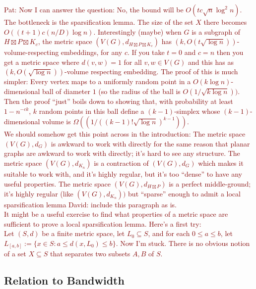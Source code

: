 \documentclass{patmorin}
\renewcommand{\le}{\leqslant}
\newcommand{\david}[1]{{\color{orange} David: #1}}
\newcommand{\pat}[1]{\textcolor{Maroon}{Pat: #1}}
\begin{document}
\pat{Now I can answer the question: No, the bound will be $O(tc\sqrt{n}\log^2 n)$.  The bottleneck is the sparsification lemma.  The size of the set $X$ there becomes $O((t+1)c(n/D)\log n)$.  Interestingly (maybe) when $G$ is a subgraph of $H\boxtimes P\boxtimes K_c$, the metric space $(V(G),d_{H\boxtimes P\boxtimes K_c})$ has $(k,O(t\sqrt{\log n}))$-volume-respecting embeddings, for any $c$. If you take $t=0$ and $c=n$ then you get a metric space where $d(v,w)=1$ for all  $v,w\in V(G)$ and this has as $(k,O(\sqrt{\log n}))$-volume respecting embedding.  The proof of this is much simpler: Every vertex maps to a uniformly random point in a $O(k\log n)$-dimensional ball of diameter $1$ (so the radius of the ball is $O(1/\sqrt{k\log n}))$.  Then the proof ``just'' boils down to showing that, with probability at least $1-n^{-ck}$, $k$ random points in this ball define a $(k-1)$-simplex whose $(k-1)$-dimensional volume is $\Omega((1/((k-1)!\sqrt{\log n})^{k-1}))$. \\[2ex]
We should somehow get this point across in the introduction:  The metric space $(V(G),d_G)$ is awkward to work with directly for the same reason that planar graphs are awkward to work with directly; it's hard to see any structure.  The metric space $(V(G),d_{K_n})$ is a contraction of $(V(G),d_G)$ which makes it suitable to work with, and it's highly regular, but it's too ``dense'' to have any useful properties.  The metric space $(V(G),d_{H\boxtimes P})$ is a perfect middle-ground; it's highly regular (like $(V(G),d_{K_n}))$ but ``sparse'' enough to admit a local sparsification lemma \david{include this paragraph as is}.\\[2ex]
It might be a useful exercise to find what properties of a metric space are sufficient to prove a local sparsification lemma.  Here's a first try:\\[2ex]
Let $(S,d)$ be a finite metric space, let $L_0\subseteq S$, and for each $0\le a\le b$, let $L_{[a,b]}:=\{x\in S: a\le d(x,L_0)\le b\}$.  Now I'm stuck.  There is no obvious notion of a set $X\subseteq S$ that separates two subsets $A,B$ of $S$.
}

\subsection{Relation to Bandwidth}
\end{document}
